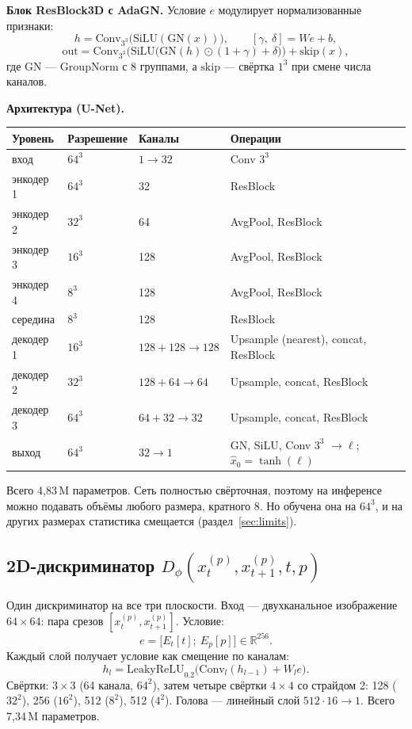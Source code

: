 \documentclass[11pt,a4paper]{article}
\begin{document}
\textbf{Блок ResBlock3D с AdaGN.} Условие $e$ модулирует нормализованные признаки:
\[
  h = \mathrm{Conv}_{3^3}\big(\mathrm{SiLU}(\mathrm{GN}(x))\big),\qquad
  [\gamma,\ \delta] = W e + b,
\]
\[
  \mathrm{out} = \mathrm{Conv}_{3^3}\Big(\mathrm{SiLU}\big(\mathrm{GN}(h)\odot(1+\gamma) + \delta\big)\Big) + \mathrm{skip}(x),
\]
где $\mathrm{GN}$ — GroupNorm с 8 группами, а $\mathrm{skip}$ — свёртка $1^3$ при смене числа каналов.

\textbf{Архитектура (U-Net).}
\begin{center}
\small
\begin{tabular}{@{}llll@{}}
\toprule
Уровень & Разрешение & Каналы & Операции \\
\midrule
вход & $64^3$ & $1\to32$ & Conv $3^3$ \\
энкодер 1 & $64^3$ & 32 & ResBlock \\
энкодер 2 & $32^3$ & 64 & AvgPool, ResBlock \\
энкодер 3 & $16^3$ & 128 & AvgPool, ResBlock \\
энкодер 4 & $8^3$ & 128 & AvgPool, ResBlock \\
середина & $8^3$ & 128 & ResBlock \\
декодер 1 & $16^3$ & $128+128\to128$ & Upsample (nearest), concat, ResBlock \\
декодер 2 & $32^3$ & $128+64\to64$ & Upsample, concat, ResBlock \\
декодер 3 & $64^3$ & $64+32\to32$ & Upsample, concat, ResBlock \\
выход & $64^3$ & $32\to1$ & GN, SiLU, Conv $3^3$ $\to\ell$;\ \ $\hat x_0=\tanh(\ell)$ \\
\bottomrule
\end{tabular}
\end{center}
Всего 4{,}83\,M параметров. Сеть полностью свёрточная, поэтому на инференсе можно подавать объёмы любого
размера, кратного 8. Но обучена она на $64^3$, и на других размерах статистика смещается
(раздел~\ref{sec:limits}).

\subsection{2D-дискриминатор $D_\phi(x_t^{(p)}, x_{t+1}^{(p)}, t, p)$}
Один дискриминатор на все три плоскости. Вход — двухканальное изображение $64\times64$:
пара срезов $[x_t^{(p)}, x_{t+1}^{(p)}]$. Условие:
\[
  e = \big[E_t[t];\ E_p[p]\big]\in\mathbb R^{256}.
\]
Каждый слой получает условие как смещение по каналам:
\[
  h_l = \mathrm{LeakyReLU}_{0.2}\big(\mathrm{Conv}_l(h_{l-1}) + W_l e\big).
\]
Свёртки: $3\times3$ (64 канала, $64^2$), затем четыре свёртки $4\times4$ со страйдом 2: 128 ($32^2$),
256 ($16^2$), 512 ($8^2$), 512 ($4^2$). Голова — линейный слой $512\cdot16\to1$. Всего 7{,}34\,M параметров.
\end{document}

